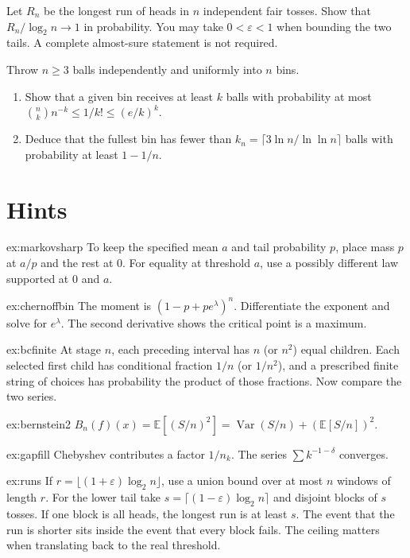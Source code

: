 \begin{exercise}[$\star\star\star$]\label{ex:runs}
Let $R_n$ be the longest run of heads in $n$ independent fair tosses. Show that $R_n/\log_2 n\to 1$ in probability. You may take $0<\varepsilon<1$ when bounding the two tails. A complete almost-sure statement is not required.
\end{exercise}


\begin{exercise}[$\star\star$]\label{ex:ballsbins}
Throw $n\ge3$ balls independently and uniformly into $n$ bins.
\begin{enumerate}[label=(\alph*)]
\item Show that a given bin receives at least $k$ balls with probability at most $\binom nk n^{-k}\le 1/k!\le(e/k)^k$.
\item Deduce that the fullest bin has fewer than $k_n=\lceil 3\ln n/\ln\ln n\rceil$ balls with probability at least $1-1/n$.
\end{enumerate}
\end{exercise}

\section{Hints}

\begin{hint}{ex:markovsharp}
To keep the specified mean $a$ and tail probability $p$, place mass $p$ at $a/p$ and the rest at $0$. For equality at threshold $a$, use a possibly different law supported at $0$ and $a$.
\end{hint}
\begin{hint}{ex:chernoffbin}
The moment is $(1-p+pe^{\lambda})^n$. Differentiate the exponent and solve for $e^{\lambda}$. The second derivative shows the critical point is a maximum.
\end{hint}
\begin{hint}{ex:bcfinite}
At stage $n$, each preceding interval has $n$ (or $n^2$) equal children. Each selected first child has conditional fraction $1/n$ (or $1/n^2$), and a prescribed finite string of choices has probability the product of those fractions. Now compare the two series.
\end{hint}
\begin{hint}{ex:bernstein2}
$B_n(f)(x)=\mathbb E[(S/n)^2]=\operatorname{Var}(S/n)+(\mathbb E[S/n])^2$.
\end{hint}
\begin{hint}{ex:gapfill}
Chebyshev contributes a factor $1/n_k$. The series $\sum k^{-1-\delta}$ converges.
\end{hint}
\begin{hint}{ex:runs}
If $r=\lfloor(1+\varepsilon)\log_2 n\rfloor$, use a union bound over at most $n$ windows of length $r$. For the lower tail take $s=\lceil(1-\varepsilon)\log_2 n\rceil$ and disjoint blocks of $s$ tosses. If one block is all heads, the longest run is at least $s$. The event that the run is shorter sits inside the event that every block fails. The ceiling matters when translating back to the real threshold.
\end{hint}


